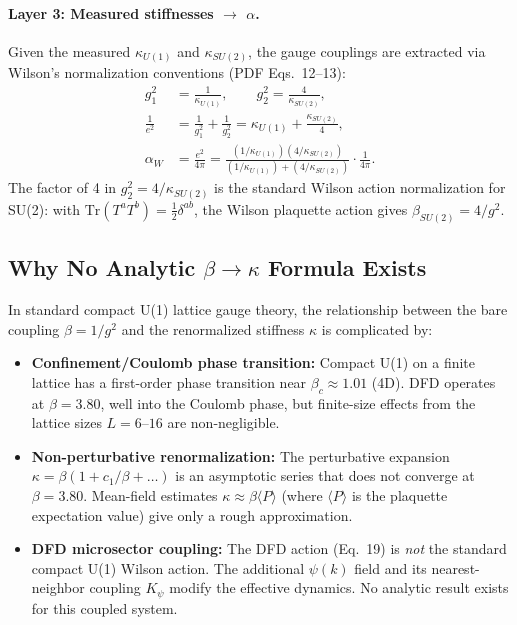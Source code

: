 \paragraph{Layer 3: Measured stiffnesses $\to$ $\alpha$.}
Given the measured $\kappa_{U(1)}$ and $\kappa_{SU(2)}$, the gauge couplings are
extracted via Wilson's normalization conventions (PDF Eqs.~12--13):
\begin{align}
g_1^2 &= \frac{1}{\kappa_{U(1)}}, \qquad
g_2^2 = \frac{4}{\kappa_{SU(2)}}, \\[6pt]
\frac{1}{e^2} &= \frac{1}{g_1^2} + \frac{1}{g_2^2}
              = \kappa_{U(1)} + \frac{\kappa_{SU(2)}}{4}, \\[6pt]
\alpha_W &= \frac{e^2}{4\pi}
          = \frac{(1/\kappa_{U(1)})(4/\kappa_{SU(2)})}
                 {(1/\kappa_{U(1)}) + (4/\kappa_{SU(2)})}
            \cdot \frac{1}{4\pi}.
\end{align}
The factor of 4 in $g_2^2 = 4/\kappa_{SU(2)}$ is the standard Wilson action
normalization for SU(2): with $\mathrm{Tr}(T^a T^b) = \frac{1}{2}\delta^{ab}$,
the Wilson plaquette action gives $\beta_{SU(2)} = 4/g^2$.

\subsection{Why No Analytic $\beta \to \kappa$ Formula Exists}

In standard compact U(1) lattice gauge theory, the relationship between
the bare coupling $\beta = 1/g^2$ and the renormalized stiffness $\kappa$
is complicated by:

\begin{itemize}
\item \textbf{Confinement/Coulomb phase transition:} Compact U(1) on a
      finite lattice has a first-order phase transition near $\beta_c \approx 1.01$
      (4D). DFD operates at $\beta = 3.80$, well into the Coulomb phase,
      but finite-size effects from the lattice sizes $L = 6$--$16$ are
      non-negligible.

\item \textbf{Non-perturbative renormalization:} The perturbative expansion
      $\kappa = \beta(1 + c_1/\beta + \ldots)$ is an asymptotic series that
      does not converge at $\beta = 3.80$. Mean-field estimates
      $\kappa \approx \beta \langle P \rangle$ (where $\langle P \rangle$ is the
      plaquette expectation value) give only a rough approximation.

\item \textbf{DFD microsector coupling:} The DFD action (Eq.~19) is
      \emph{not} the standard compact U(1) Wilson action. The additional
      $\psi(k)$ field and its nearest-neighbor coupling $K_\psi$ modify
      the effective dynamics. No analytic result exists for this coupled system.
\end{itemize}


